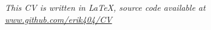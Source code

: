 \emph{
\newline
\newline
\newline
\footnotesize{
	This CV is written in LaTeX, source code available at \url{www.github.com/erik404/CV}
    }
}